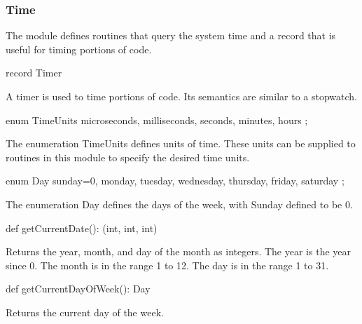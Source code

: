 \subsubsection{Time}
\label{Time}

The module  defines routines that query the system time and
a record  that is useful for timing portions of code.

\vspace{1pc}

\begin{protohead}
record Timer
\end{protohead}
\begin{protobody}
A timer is used to time portions of code.  Its semantics are similar
to a stopwatch.
\end{protobody}

\begin{protohead}
enum TimeUnits { microseconds, milliseconds, seconds, minutes, hours };
\end{protohead}
\begin{protobody}
The enumeration TimeUnits defines units of time.  These units can be
supplied to routines in this module to specify the desired time units.
\end{protobody}

\begin{protohead}
enum Day { sunday=0, monday, tuesday, wednesday, thursday, friday, saturday };
\end{protohead}
\begin{protobody}
The enumeration Day defines the days of the week, with Sunday defined to be 0.
\end{protobody}


\begin{protohead}
def getCurrentDate(): (int, int, int)
\end{protohead}
\begin{protobody}
Returns the year, month, and day of the month as integers.  The year
is the year since 0.  The month is in the range 1 to 12.  The day is
in the range 1 to 31.
\end{protobody}

\begin{protohead}
def getCurrentDayOfWeek(): Day
\end{protohead}
\begin{protobody}
Returns the current day of the week.
\end{protobody}


